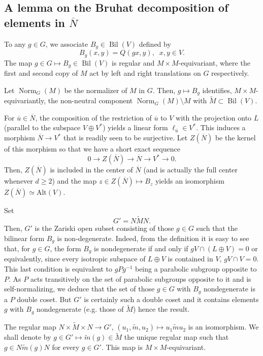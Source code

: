 \documentclass[12pt]{article}
\numberwithin{equation}{section}
\def\tM{\widetilde{M}}
\def\tm{\widetilde{m}}
\def\Alt{\mathrm{Alt}}
\DeclareMathOperator{\Bil}{Bil}
\DeclareMathOperator{\Norm}{Norm}
\begin{document}
\subsection{A lemma on the Bruhat decomposition of elements in $\overline{N}$}
	
	To any $g\in G$, we associate $B_g\in \Bil(V)$ defined by
	$$B_g(x,y)=Q(gx,y),\;\; x,y\in V.$$
	The map $g\in G\mapsto B_g\in \Bil(V)$ is regular and $M\times M$-equivariant, where the first and second copy of $M$ act by left and right translations on $G$ respectively.
	
	Let $\Norm_G(M)$ be the normalizer of $M$ in $G$. Then, $g\mapsto B_g$ identifies, $M\times M$-equivariantly, the non-neutral component $\Norm_G(M)\setminus M$ with $\tM\subset \Bil(V)$.
	
	For $\overline{u}\in \overline{N}$, the composition of the restriction of $\overline{u}$ to $V$ with the projection onto $L$ (parallel to the subspace $V\oplus V^*$) yields a linear form $\ell_{\overline{u}}\in V^*$. This induces a morphism $\overline{N}\to V^*$ that is readily seen to be surjective. Let $Z(\overline{N})$ be the kernel of this morphism so that we have a short exact sequence
	\begin{equation}\label{eq0}
		\displaystyle 0\to Z(\overline{N})\to \overline{N}\to V^*\to 0.
	\end{equation}
	Then, $Z(\overline{N})$ is included in the center of $\overline{N}$ (and is actually the full center whenever $d\geq 2$) and the map $z\in Z(\overline{N})\mapsto B_z$ yields an isomorphism $Z(\overline{N})\simeq \Alt(V)$.
	
	Set
	$$\displaystyle G'=N \tM N.$$
	Then, $G'$ is the Zariski open subset consisting of those $g\in G$ such that the bilinear form $B_g$ is non-degenerate. Indeed, from the definition it is easy to see that, for $g\in G$, the form $B_g$ is nondegenerate  if and only if $gV\cap (L\oplus V)=0$ or equivalently, since every isotropic subspace of $L\oplus V$ is contained in $V$, $gV\cap V=0$. This last condition is equivalent to $gPg^{-1}$ being a parabolic subgroup opposite to $P$. As $P$ acts transitively on the set of parabolic subgroups opposite to it and is self-normalizing, we deduce that the set of those $g\in G$ with $B_g$ nondegenerate is a $P$ double coset. But $G'$ is certainly such a double coset and it contains elements $g$ with $B_g$ nondegenerate (e.g. those of $\tM$) hence the result.
	
	The regular map $N\times \tM\times N\to G'$, $(u_1,\tm,u_2)\mapsto u_1 \tm u_2$ is an isomorphism. We shall denote by $g\in G'\mapsto \tm(g)\in \tM$ the unique regular map such that $g\in N\tm(g)N$ for every $g\in G'$. This map is $M\times M$-equivariant.
	
\end{document}
